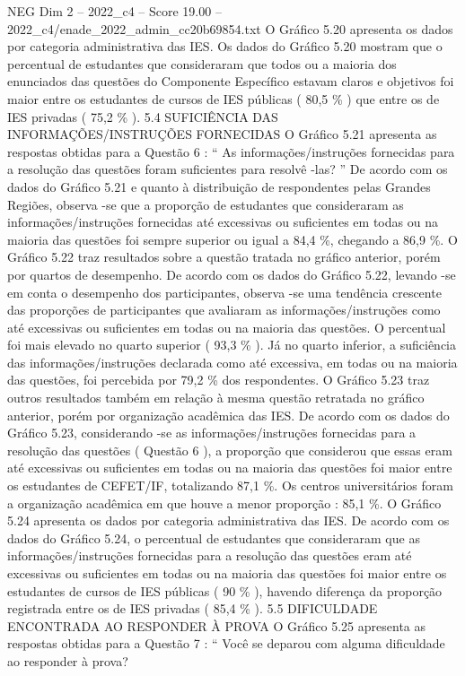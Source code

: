 \begin{textsample}{NEG Dim 2 – 2022\_c4 – Score 19.00 – 2022\_c4/enade\_2022\_admin\_cc20b69854.txt}
O Gráfico 5.20 apresenta os dados por categoria administrativa das IES.
Os dados do Gráfico 5.20 mostram que o percentual de estudantes que consideraram que todos ou a maioria dos enunciados das questões do Componente Específico estavam claros e objetivos foi maior entre os estudantes de cursos de IES públicas ( 80,5 \% ) que entre os de IES privadas ( 75,2 \% ). 5.4 SUFICIÊNCIA DAS INFORMAÇÕES/INSTRUÇÕES FORNECIDAS O Gráfico 5.21 apresenta as respostas obtidas para a Questão 6 : “ As informações/instruções fornecidas para a resolução das questões foram suficientes para resolvê -las? ” De acordo com os dados do Gráfico 5.21 e quanto à distribuição de respondentes pelas Grandes Regiões, observa -se que a proporção de estudantes que consideraram as informações/instruções fornecidas até excessivas ou suficientes em todas ou na maioria das questões foi sempre superior ou igual a 84,4 \%, chegando a 86,9 \%.
O Gráfico 5.22 traz resultados sobre a questão tratada no gráfico anterior, porém por quartos de desempenho.
De acordo com os dados do Gráfico 5.22, levando -se em conta o desempenho dos participantes, observa -se uma tendência crescente das proporções de participantes que avaliaram as informações/instruções como até excessivas ou suficientes em todas ou na maioria das questões.
O percentual foi mais elevado no quarto superior ( 93,3 \% ).
Já no quarto inferior, a suficiência das informações/instruções declarada como até excessiva, em todas ou na maioria das questões, foi percebida por 79,2 \% dos respondentes.
O Gráfico 5.23 traz outros resultados também em relação à mesma questão retratada no gráfico anterior, porém por organização acadêmica das IES.
De acordo com os dados do Gráfico 5.23, considerando -se as informações/instruções fornecidas para a resolução das questões ( Questão 6 ), a proporção que considerou que essas eram até excessivas ou suficientes em todas ou na maioria das questões foi maior entre os estudantes de CEFET/IF, totalizando 87,1 \%.
Os centros universitários foram a organização acadêmica em que houve a menor proporção : 85,1 \%.
O Gráfico 5.24 apresenta os dados por categoria administrativa das IES.
De acordo com os dados do Gráfico 5.24, o percentual de estudantes que consideraram que as informações/instruções fornecidas para a resolução das questões eram até excessivas ou suficientes em todas ou na maioria das questões foi maior entre os estudantes de cursos de IES públicas ( 90 \% ), havendo diferença da proporção registrada entre os de IES privadas ( 85,4 \% ). 5.5 DIFICULDADE ENCONTRADA AO RESPONDER À PROVA O Gráfico 5.25 apresenta as respostas obtidas para a Questão 7 : “ Você se deparou com alguma dificuldade ao responder à prova?

\end{textsample}
